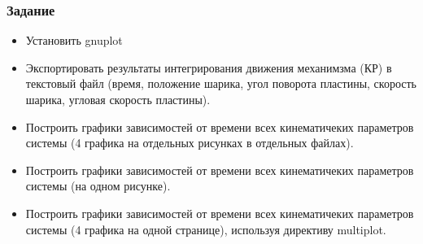 \documentclass[12pt, compress]{beamer}
\renewcommand{\emph}[1]{\textcolor{dark-blue}{#1}}
\begin{document}
\begin{frame}[t]
\frametitle{Задание}
\begin{itemize}
  \item Установить \emph{gnuplot}
  \item Экспортировать результаты интегрирования движения механимзма (КР) в текстовый файл (время, положение шарика, угол поворота пластины, скорость шарика, угловая скорость пластины).
  \item Построить графики зависимостей от времени всех кинематичеких параметров системы (4 графика на отдельных рисунках в  отдельных файлах).
  \item Построить графики зависимостей от времени всех кинематичеких параметров системы (на одном рисунке).
  \item Построить графики зависимостей от времени всех кинематичеких параметров системы (4 графика на одной странице), используя директиву \emph{multiplot}.
\end{itemize}
  
\end{frame}


 
\end{document}
